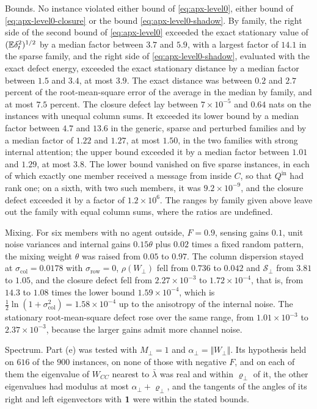 \begin{numcheck}
Bounds. No instance violated either bound of \eqref{eq:apx-level0}, either bound of \eqref{eq:apx-level0-closure} or the bound \eqref{eq:apx-level0-shadow}. By family, the right side of the second bound of \eqref{eq:apx-level0} exceeded the exact stationary value of $(\mathbb{E}\delta_t^2)^{1/2}$ by a median factor between $3.7$ and $5.9$, with a largest factor of $14.1$ in the sparse family, and the right side of \eqref{eq:apx-level0-shadow}, evaluated with the exact defect energy, exceeded the exact stationary distance by a median factor between $1.5$ and $3.4$, at most $3.9$. The exact distance was between $0.2$ and $2.7$ percent of the root-mean-square error of the average in the median by family, and at most $7.5$ percent. The closure defect lay between $7\times10^{-5}$ and $0.64$ nats on the instances with unequal column sums. It exceeded its lower bound by a median factor between $4.7$ and $13.6$ in the generic, sparse and perturbed families and by a median factor of $1.22$ and $1.27$, at most $1.50$, in the two families with strong internal attention; the upper bound exceeded it by a median factor between $1.01$ and $1.29$, at most $3.8$. The lower bound vanished on five sparse instances, in each of which exactly one member received a message from inside $C$, so that $Q^{\mathrm{in}}$ had rank one; on a sixth, with two such members, it was $9.2\times10^{-9}$, and the closure defect exceeded it by a factor of $1.2\times10^6$. The ranges by family given above leave out the family with equal column sums, where the ratios are undefined.

Mixing. For six members with no agent outside, $F=0.9$, sensing gains $0.1$, unit noise variances and internal gains $0.15\theta$ plus $0.02$ times a fixed random pattern, the mixing weight $\theta$ was raised from $0.05$ to $0.97$. The column dispersion stayed at $\sigma_{\mathrm{col}}=0.0178$ with $\sigma_{\mathrm{row}}=0$, $\rho(W_\perp)$ fell from $0.736$ to $0.042$ and $\mathcal S_\perp$ from $3.81$ to $1.05$, and the closure defect fell from $2.27\times10^{-3}$ to $1.72\times10^{-4}$, that is, from $14.3$ to $1.08$ times the lower bound $1.59\times10^{-4}$, which is $\frac12\ln(1+\sigma_{\mathrm{col}}^2)=1.58\times10^{-4}$ up to the anisotropy of the internal noise. The stationary root-mean-square defect rose over the same range, from $1.01\times10^{-3}$ to $2.37\times10^{-3}$, because the larger gains admit more channel noise.

Spectrum. Part (e) was tested with $M_\perp=1$ and $\alpha_\perp=\Vert W_\perp\Vert$. Its hypothesis held on $616$ of the $900$ instances, on none of those with negative $F$, and on each of them the eigenvalue of $W_{CC}$ nearest to $\bar\lambda$ was real and within $\varrho_\perp$ of it, the other eigenvalues had modulus at most $\alpha_\perp+\varrho_\perp$, and the tangents of the angles of its right and left eigenvectors with $\mathbf{1}$ were within the stated bounds.


\end{numcheck}
